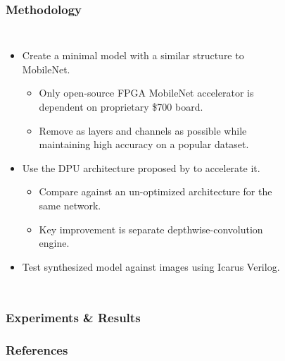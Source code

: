 \documentclass[english]{beamer}
\begin{document}
\begin{frame}
\frametitle{Methodology}
\begin{columns}
	\begin{itemize}
		\item Create a minimal model with a similar structure to MobileNet.
		\begin{itemize}
			\item Only open-source FPGA MobileNet
			accelerator\supercite{solovyev2019mobilenet} is dependent on
			proprietary \$700 board.
			\item Remove as layers and channels as possible while maintaining high
			accuracy on a popular dataset.
		\end{itemize}
		\item Use the DPU architecture proposed by
		\citeauthor{mobilenet2019fpga}\supercite{mobilenet2019fpga}
		to accelerate it.
		\begin{itemize}
			\item Compare against an un-optimized architecture for the same network.
			\item Key improvement is separate depthwise-convolution engine.
		\end{itemize}
		\item Test synthesized model against images using Icarus Verilog.
	\end{itemize}
	\begin{figure}
		\centering
		
	\end{figure}
\end{columns}
\end{frame}


\begin{frame}
\frametitle{Experiments \& Results}
\end{frame}


\begin{frame}[allowframebreaks]
\frametitle{References}
\tiny\printbibliography
\end{frame}
\end{document}
